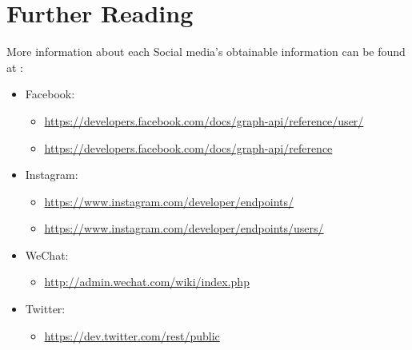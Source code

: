 \documentclass{article}
\begin{document}
\cleardoublepage
\section{Further Reading}
More information about each Social media's obtainable information can be found at :
\begin{itemize}
\item Facebook:
\begin{itemize}
\item \href{https://developers.facebook.com/docs/graph-api/reference/user/}{https://developers.facebook.com/docs/graph-api/reference/user/}
\item \href{https://developers.facebook.com/docs/graph-api/reference}{https://developers.facebook.com/docs/graph-api/reference}
\end{itemize}

\item Instagram:
\begin{itemize}
\item \href{https://www.instagram.com/developer/endpoints/}{https://www.instagram.com/developer/endpoints/}
\item \href{https://www.instagram.com/developer/endpoints/users/}{https://www.instagram.com/developer/endpoints/users/}
\end{itemize}

\item WeChat:
\begin{itemize}
\item \href{http://admin.wechat.com/wiki/index.php?title=Main_Page}{http://admin.wechat.com/wiki/index.php}
\end{itemize}

\item Twitter:
\begin{itemize}
\item \href{https://dev.twitter.com/rest/public}{https://dev.twitter.com/rest/public}
\end{itemize}

\end{itemize}
\end{document}
